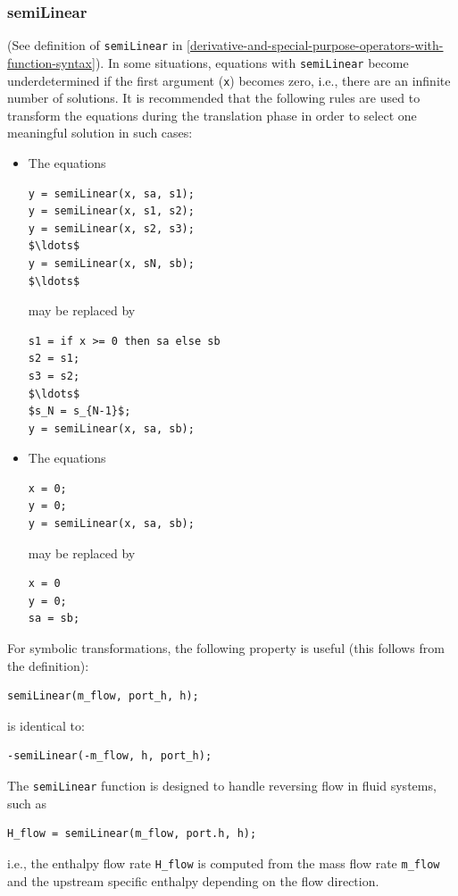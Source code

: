 \subsubsection{semiLinear}\label{semilinear}

(See definition of \lstinline!semiLinear! in \cref{derivative-and-special-purpose-operators-with-function-syntax}).
In some situations, equations with \lstinline!semiLinear! become underdetermined if the first argument (\lstinline!x!) becomes zero, i.e., there are an infinite number of solutions.
It is recommended that the following rules are used to transform the equations during the translation phase in order to select one meaningful solution in such cases:
\begin{itemize}
\item
The equations
\begin{lstlisting}[language=modelica]
y = semiLinear(x, sa, s1);
y = semiLinear(x, s1, s2);
y = semiLinear(x, s2, s3);
$\ldots$
y = semiLinear(x, sN, sb);
$\ldots$
\end{lstlisting}
may be replaced by
\begin{lstlisting}[language=modelica]
s1 = if x >= 0 then sa else sb
s2 = s1;
s3 = s2;
$\ldots$
$s_N = s_{N-1}$;
y = semiLinear(x, sa, sb);
\end{lstlisting}

\item
The equations
\begin{lstlisting}[language=modelica]
x = 0;
y = 0;
y = semiLinear(x, sa, sb);
\end{lstlisting}
may be replaced by
\begin{lstlisting}[language=modelica]
x = 0
y = 0;
sa = sb;
\end{lstlisting}
\end{itemize}

\begin{nonnormative}
For symbolic transformations, the following property is useful (this follows from the definition):
\begin{lstlisting}[language=modelica]
semiLinear(m_flow, port_h, h);
\end{lstlisting}
is identical to:
\begin{lstlisting}[language=modelica]
-semiLinear(-m_flow, h, port_h);
\end{lstlisting}

The \lstinline!semiLinear! function is designed to handle reversing flow in fluid systems, such as
\begin{lstlisting}[language=modelica]
H_flow = semiLinear(m_flow, port.h, h);
\end{lstlisting}
i.e., the enthalpy flow rate \lstinline!H_flow! is computed from the mass flow rate \lstinline!m_flow! and the upstream specific enthalpy depending on the flow direction.
\end{nonnormative}

